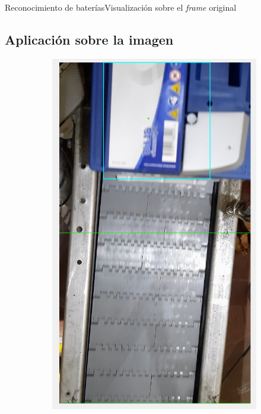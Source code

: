 \documentclass{beamer}
\begin{document}
\begin{frame}{Reconocimiento de baterías}{Visualización sobre el \textit{frame} original}
\subsection{Aplicación sobre la imagen}
\begin{figure}
\centering
    \begin{subfigure}[t]{0.4\textwidth}
        \includegraphics[width=\textwidth]{img/P1.png}
    \end{subfigure}

\end{figure}
\end{frame}
\end{document}
